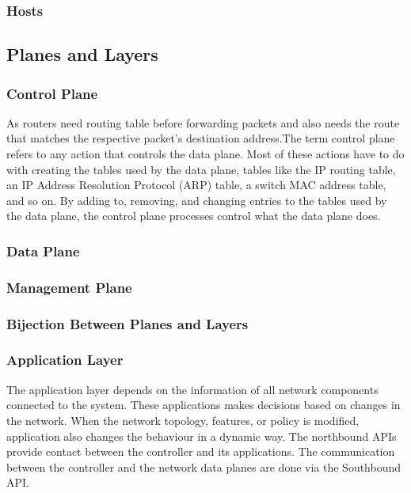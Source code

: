 \documentclass[conference]{IEEEtran}
\begin{document}
        \subsubsection{Hosts}
        
    
    \subsection{Planes and Layers}
        \subsubsection{Control Plane}
            As routers need routing table before forwarding packets and also needs the route that matches the respective packet's destination address.The term control plane refers to any action that controls the data plane. Most of these actions have to do with creating the tables used by the data plane, tables like the IP routing table, an IP Address Resolution Protocol (ARP) table, a switch MAC address table, and so on. By adding to, removing, and changing entries to the tables used by the data plane, the control plane processes control what the data plane does. \cite{b1}

        \subsubsection{Data Plane}

        \subsubsection{Management Plane}

        \subsubsection{Bijection Between Planes and Layers}

        \subsubsection{Application Layer}
            The application layer depends on the information of all network components connected to the system. These applications makes decisions based on changes in the network. When the network topology, features, or policy is modified, application also changes the behaviour in a dynamic way. The northbound APIs provide contact between the controller and its applications. The communication between the controller and the network data planes are done via the Southbound API. \cite{b2}
            
\end{document}
